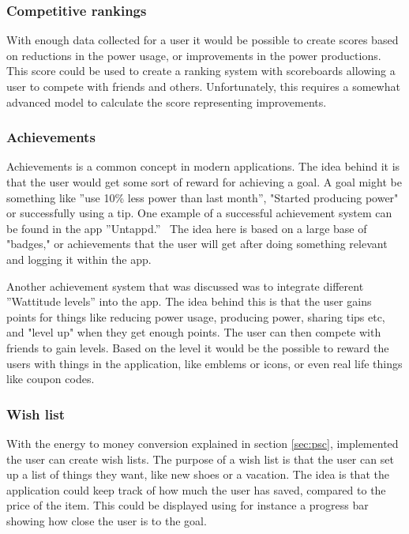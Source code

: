 \subsubsection{Competitive rankings}
With enough data collected for a user it would be possible to create scores based on reductions in the power usage, or improvements in the power productions. This score could be used to create a ranking system with scoreboards allowing a user to compete with friends and others. Unfortunately, this requires a somewhat advanced model to calculate the score representing improvements.

\subsubsection{Achievements}
Achievements is a common concept in modern applications. The idea behind it is that the user would get some sort of reward for achieving a goal. A goal might be something like ''use 10\% less power than last month'', "Started producing power" or successfully using a tip.
One example of a successful achievement system can be found in the app ''Untappd.''~\cite{untappd}
The idea here is based on a large base of "badges," or achievements that the user will get after doing something relevant and logging it within the app. 

Another achievement system that was discussed was to integrate different ''Wattitude levels'' into the app. The idea behind this is that the user gains points for things like reducing power usage, producing power, sharing tips etc, and "level up" when they get enough points. The user can then compete with friends to gain levels. Based on the level it would be the possible to reward the users with things in the application, like emblems or icons, or even real life things like coupon codes.


\subsubsection{Wish list}
With the energy to money conversion explained in section \ref{sec:psc}, implemented the user can create wish lists. 
The purpose of a wish list is that the user can set up a list of things they want, like new shoes or a vacation. The idea is that the application could keep track of how much the user has saved, compared to the price of the item. This could be displayed using for instance a progress bar showing how close the user is to the goal.


